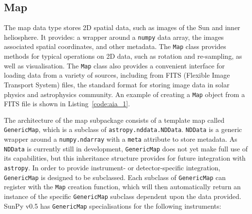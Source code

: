\subsection{Map}\label{ssec:map}
The map data type stores 2D spatial data, such as images of the Sun and 
inner heliosphere. It provides: a wrapper around a \texttt{numpy} data array, 
the images associated spatial coordinates, and other metadata. The \texttt{Map} 
class provides methods for typical operations on 2D data, such as rotation and 
re-sampling, as well as visualisation.
The \texttt{Map} class also provides a convenient interface for loading data 
from a variety of sources, including from FITS (Flexible Image Transport System) 
files, the standard format for storing image data in solar physics and astrophysics community. 
An example of creating a \texttt{Map} object from a FITS file is shown in 
Listing~\ref{code:aia_1}.

The architecture of the map subpackage consists of a template map called
\texttt{GenericMap}, which is a subclass of \texttt{astropy.nddata.NDData}. 
\texttt{NDData} is a generic wrapper around a \texttt{numpy.ndarray} with a 
\texttt{meta} attribute to store metadata.
As \texttt{NDData} is currently still in development, \texttt{GenericMap} does 
not yet make full use of its capabilities, but this inheritance structure 
provides for future integration with \texttt{astropy}. In order to provide 
instrument- or detector-specific integration, \texttt{GenericMap} is designed
to be subclassed. Each subclass of \texttt{GenericMap} can register 
with the \texttt{Map} creation function, which will then automatically return an instance
of the specific \texttt{GenericMap} subclass dependent upon the data provided. 
SunPy v0.5 has \texttt{GenericMap} specialisations for the following 
instruments: 

